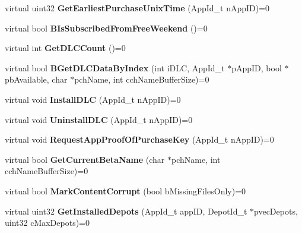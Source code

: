\begin{DoxyCompactItemize}
virtual uint32 {\bfseries Get\+Earliest\+Purchase\+Unix\+Time} (App\+Id\+\_\+t n\+App\+ID)=0
\item 
\mbox{\label{class_i_steam_apps_a513d6e5bb54c2885557f104279c02672}} 
virtual bool {\bfseries B\+Is\+Subscribed\+From\+Free\+Weekend} ()=0
\item 
\mbox{\label{class_i_steam_apps_ac8002fc5232fc1d28d88a95b925e2a72}} 
virtual int {\bfseries Get\+D\+L\+C\+Count} ()=0
\item 
\mbox{\label{class_i_steam_apps_a5ec35d2fc8a3966d003cc653c3fe8c4a}} 
virtual bool {\bfseries B\+Get\+D\+L\+C\+Data\+By\+Index} (int i\+D\+LC, App\+Id\+\_\+t $\ast$p\+App\+ID, bool $\ast$pb\+Available, char $\ast$pch\+Name, int cch\+Name\+Buffer\+Size)=0
\item 
\mbox{\label{class_i_steam_apps_a534d0b9be923296863471570cab33ba1}} 
virtual void {\bfseries Install\+D\+LC} (App\+Id\+\_\+t n\+App\+ID)=0
\item 
\mbox{\label{class_i_steam_apps_abf17987da1339b115f719a29020cefdb}} 
virtual void {\bfseries Uninstall\+D\+LC} (App\+Id\+\_\+t n\+App\+ID)=0
\item 
\mbox{\label{class_i_steam_apps_a0d2c29431c950b9b0dc3ee7749b65e4e}} 
virtual void {\bfseries Request\+App\+Proof\+Of\+Purchase\+Key} (App\+Id\+\_\+t n\+App\+ID)=0
\item 
\mbox{\label{class_i_steam_apps_a22f4f5850142d0db3f2c897863cbeead}} 
virtual bool {\bfseries Get\+Current\+Beta\+Name} (char $\ast$pch\+Name, int cch\+Name\+Buffer\+Size)=0
\item 
\mbox{\label{class_i_steam_apps_ac9b871437aa6525bfc09913962fd4ac9}} 
virtual bool {\bfseries Mark\+Content\+Corrupt} (bool b\+Missing\+Files\+Only)=0
\item 
\mbox{\label{class_i_steam_apps_ad99e47bcc0d1901f9b48ceb9fa3e5817}} 
virtual uint32 {\bfseries Get\+Installed\+Depots} (App\+Id\+\_\+t app\+ID, Depot\+Id\+\_\+t $\ast$pvec\+Depots, uint32 c\+Max\+Depots)=0
\item 

\end{DoxyCompactItemize}
